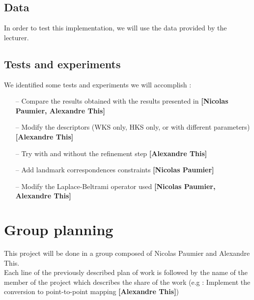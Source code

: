 \documentclass{article}
\begin{document}
\subsection{Data}
In order to test this implementation, we will use the data provided by the lecturer.

\subsection{Tests and experiments}
We identified some tests and experiments we will accomplish :

\begin{itemize}
\item[--]{Compare the results obtained with the results presented in \cite{ovsjanikov2012functional} \textbf{[Nicolas Paumier, Alexandre This]}}
\item[--]{Modify the descriptors (WKS only, HKS only, or with different parameters) \textbf{[Alexandre This]}}
\item[--]{Try with and without the refinement step \textbf{[Alexandre This]}}
\item[--]{Add landmark correspondences constraints \textbf{[Nicolas Paumier]}}
\item[--]{Modify the Laplace-Beltrami operator used \textbf{[Nicolas Paumier, Alexandre This]}}
\end{itemize}

\section{Group planning}
This project will be done in a group composed of Nicolas Paumier and Alexandre This. \\

Each line of the previously described plan of work is followed by the name of the member of the project which describes the share of the work (e.g : Implement the conversion to point-to-point mapping \textbf{[Alexandre This]})



\end{document}

